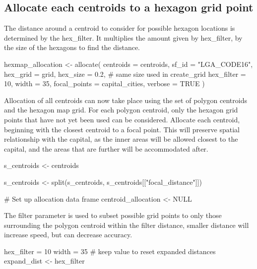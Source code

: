 \hypertarget{allocate-each-centroids-to-a-hexagon-grid-point}{%
\subsection{Allocate each centroids to a hexagon grid
point}\label{allocate-each-centroids-to-a-hexagon-grid-point}}

The distance around a centroid to consider for possible hexagon
locations is determined by the hex\_filter. It multiplies the amount
given by hex\_filter, by the size of the hexagons to find the distance.

\begin{Schunk}
\begin{Sinput}
hexmap_allocation <- allocate(
  centroids = centroids,
  sf_id = "LGA_CODE16",
  hex_grid = grid,
  hex_size = 0.2, # same size used in create_grid
  hex_filter = 10,
  width = 35,
  focal_points = capital_cities,
  verbose = TRUE
)
\end{Sinput}
\end{Schunk}

Allocation of all centroids can now take place using the set of polygon
centroids and the hexagon map grid. For each polygon centroid, only the
hexagon grid points that have not yet been used can be considered.
Allocate each centroid, beginning with the closest centroid to a focal
point. This will preserve spatial relationship with the capital, as the
inner areas will be allowed closest to the capital, and the areas that
are further will be accommodated after.

\begin{Schunk}
\begin{Sinput}
s_centroids <- centroids %

s_centroids <- split(s_centroids, s_centroids[["focal_distance"]])
        
# Set up allocation data frame
centroid_allocation <- NULL
\end{Sinput}
\end{Schunk}

The filter parameter is used to subset possible grid points to only
those surrounding the polygon centroid within the filter distance,
smaller distance will increase speed, but can decrease accuracy.

\begin{Schunk}
\begin{Sinput}
hex_filter = 10
width = 35
# keep value to reset expanded distances
expand_dist <- hex_filter
\end{Sinput}
\end{Schunk}

